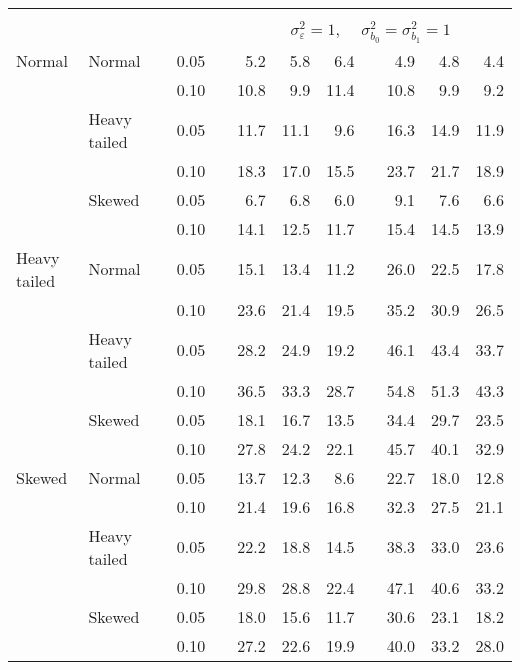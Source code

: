 \begin{table}[ht]
\begin{scriptsize}
\begin{center}
\begin{tabular}{ll p{.1cm} c p{.1cm} rrr p{.1cm} rrr}
&&&&&&&&&&&\\
& && && \multicolumn{7}{c}{$\sigma_{\varepsilon}^2 = 1$, \ \ $\sigma_{b_0}^2 = \sigma_{b_1}^2 = 1$} \\ \cline{6-12}
Normal       & Normal       && 0.05 &&   5.2 & 5.8 & 6.4 &   & 4.9 & 4.8 & 4.4 \\ 
             &              && 0.10 &&   10.8 & 9.9 & 11.4 &   & 10.8 & 9.9 & 9.2 \\ 
             & Heavy tailed && 0.05 &&   11.7 & 11.1 & 9.6 &   & 16.3 & 14.9 & 11.9 \\ 
             &              && 0.10 &&   18.3 & 17.0 & 15.5 &   & 23.7 & 21.7 & 18.9 \\ 
             & Skewed       && 0.05 &&   6.7 & 6.8 & 6.0 &   & 9.1 & 7.6 & 6.6 \\ 
             &              && 0.10 &&   14.1 & 12.5 & 11.7 &   & 15.4 & 14.5 & 13.9 \\ 
Heavy tailed & Normal       && 0.05 &&   15.1 & 13.4 & 11.2 &   & 26.0 & 22.5 & 17.8 \\ 
             &              && 0.10 &&   23.6 & 21.4 & 19.5 &   & 35.2 & 30.9 & 26.5 \\ 
             & Heavy tailed && 0.05 &&   28.2 & 24.9 & 19.2 &   & 46.1 & 43.4 & 33.7 \\ 
             &              && 0.10 &&   36.5 & 33.3 & 28.7 &   & 54.8 & 51.3 & 43.3 \\ 
             & Skewed       && 0.05 &&   18.1 & 16.7 & 13.5 &   & 34.4 & 29.7 & 23.5 \\ 
             &              && 0.10 &&   27.8 & 24.2 & 22.1 &   & 45.7 & 40.1 & 32.9 \\ 
Skewed       & Normal       && 0.05 &&   13.7 & 12.3 & 8.6 &   & 22.7 & 18.0 & 12.8 \\ 
             &              && 0.10 &&   21.4 & 19.6 & 16.8 &   & 32.3 & 27.5 & 21.1 \\ 
             & Heavy tailed && 0.05 &&   22.2 & 18.8 & 14.5 &   & 38.3 & 33.0 & 23.6 \\ 
             &              && 0.10 &&   29.8 & 28.8 & 22.4 &   & 47.1 & 40.6 & 33.2 \\ 
             & Skewed       && 0.05 &&   18.0 & 15.6 & 11.7 &   & 30.6 & 23.1 & 18.2 \\ 
             &              && 0.10 &&   27.2 & 22.6 & 19.9 &   & 40.0 & 33.2 & 28.0 \\ 


\end{tabular}
\end{center}
\end{scriptsize}
\end{table}
